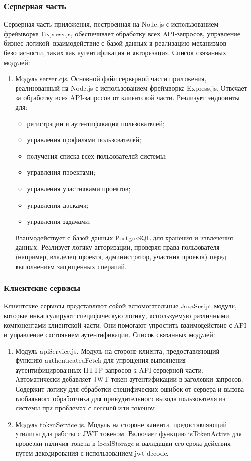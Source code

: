 \subsubsection{Серверная часть}
Серверная часть приложения, построенная на Node.js с использованием фреймворка Express.js, обеспечивает обработку всех API-запросов, управление бизнес-логикой, взаимодействие с базой данных и реализацию механизмов безопасности, таких как аутентификация и авторизация. Список связанных модулей:
\begin{enumerate}
	\item Модуль server.cjs. Основной файл серверной части приложения, реализованный на Node.js с использованием фреймворка Express.js. Отвечает за обработку всех API-запросов от клиентской части. Реализует эндпоинты для:
	\begin{itemize}
		\item регистрации и аутентификации пользователей;
		\item управления профилями пользователей;
		\item получения списка всех пользователей системы;
		\item управления проектами;
		\item управления участниками проектов;
		\item управления досками;
		\item управления задачами.
	\end{itemize}

Взаимодействует с базой данных PostgreSQL для хранения и извлечения данных. Реализует логику авторизации, проверяя права пользователя (например, владелец проекта, администратор, участник проекта) перед выполнением защищенных операций.
\end{enumerate}

\subsubsection{Клиентские сервисы}
Клиентские сервисы представляют собой вспомогательные JavaScript-модули, которые инкапсулируют специфическую логику, используемую различными компонентами клиентской части. Они помогают упростить взаимодействие с API и управление состоянием аутентификации. Список связанных модулей:
\begin{enumerate}
	\item Модуль apiService.js. Модуль на стороне клиента, предоставляющий функцию authenticatedFetch для упрощения выполнения аутентифицированных HTTP-запросов к API серверной части. Автоматически добавляет JWT токен аутентификации в заголовки запросов. Содержит логику для обработки специфических ошибок от сервера и вызова глобального обработчика для принудительного выхода пользователя из системы при проблемах с сессией или токеном.
	\item Модуль tokenService.js. Модуль на стороне клиента, предоставляющий утилиты для работы с JWT токеном. Включает функцию isTokenActive для проверки наличия токена в localStorage и валидации его срока действия путем декодирования с использованием jwt-decode.
\end{enumerate}
               
